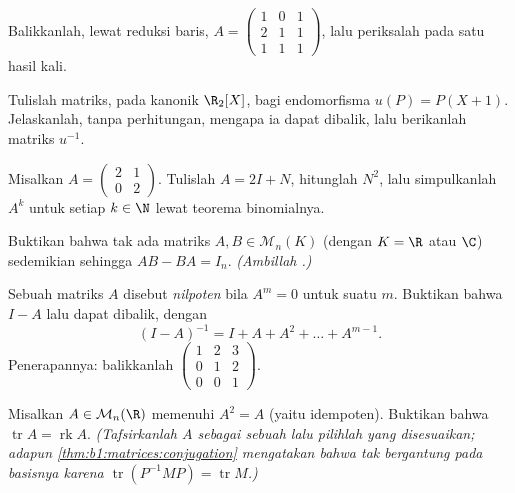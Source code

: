 \begin{exercise}[$\star$]\label{exo:b1:matrices:3}
Balikkanlah, lewat reduksi baris, $A = \begin{pmatrix} 1 & 0 & 1\\ 2 & 1 &
1\\ 1 & 1 & 1 \end{pmatrix}$, lalu periksalah pada satu hasil kali.
\end{exercise}

\begin{exercise}[$\star$]\label{exo:b1:matrices:4}
Tulislah matriks, pada  kanonik $\R_2[X]$, bagi
endomorfisma $u(P) = P(X + 1)$. Jelaskanlah, tanpa perhitungan, mengapa
ia dapat dibalik, lalu berikanlah matriks $u^{-1}$.
\end{exercise}

\begin{exercise}[$\star\star$]\label{exo:b1:matrices:5}
Misalkan $A = \begin{pmatrix} 2 & 1 \\ 0 & 2\end{pmatrix}$. Tulislah $A =
2I + N$, hitunglah $N^2$, lalu simpulkanlah $A^k$ untuk setiap $k \in \N$ lewat
teorema binomialnya.
\end{exercise}

\begin{exercise}[$\star\star$]\label{exo:b1:matrices:6}
Buktikan bahwa tak ada matriks $A, B \in \mathcal{M}_n(K)$ (dengan
$K = \R$ atau $\C$) sedemikian sehingga $AB - BA = I_n$. \emph{(Ambillah .)}
\end{exercise}

\begin{exercise}[$\star\star$]\label{exo:b1:matrices:7}
Sebuah matriks $A$ disebut \emph{nilpoten} bila $A^m = 0$ untuk suatu $m$. Buktikan
bahwa $I - A$ lalu dapat dibalik, dengan
\[
(I - A)^{-1} = I + A + A^2 + \dots + A^{m-1} .
\]
Penerapannya: balikkanlah $\begin{pmatrix} 1 & 2 & 3\\ 0 & 1 & 2\\ 0 & 0 &
1\end{pmatrix}$.
\end{exercise}

\begin{exercise}[$\star\star$]\label{exo:b1:matrices:8}
Misalkan $A \in \mathcal{M}_n(\R)$ memenuhi $A^2 = A$ (yaitu idempoten). Buktikan
bahwa $\operatorname{tr} A = \operatorname{rk} A$. \emph{(Tafsirkanlah
$A$ sebagai sebuah  lalu pilihlah  yang disesuaikan;
adapun \cref{thm:b1:matrices:conjugation} mengatakan bahwa 
tak bergantung pada basisnya karena $\operatorname{tr}(P^{-1}MP) =
\operatorname{tr} M$.)}
\end{exercise}

